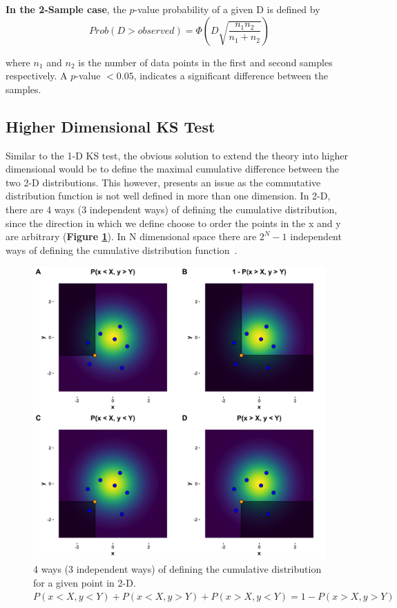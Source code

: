 \documentclass[codesnippet]{jss}
\begin{document}
\textbf{In the 2-Sample case}, the $p$-value probability of a given D is defined by
\begin{equation} \label{eq:3}
Prob(D > observed) = \Phi ( D\sqrt{\frac{n_1n_2}{n_1+n_2}})
\end{equation}

where $n_1$ and $n_2$ is the number of data points in the first and second samples respectively. A $p$-value $< 0.05$, indicates a significant difference between the samples.

\subsection{Higher Dimensional KS Test}

Similar to the 1-D KS test, the obvious solution to extend the theory into higher dimensional would be to define the maximal cumulative difference between the two 2-D distributions. This however, presents an issue as the commutative distribution function is not well defined in more than one dimension. In 2-D, there are 4 ways (3 independent ways) of defining the cumulative distribution, since the direction in which we define choose to order the points in the x and y are arbitrary (\textbf{Figure \ref{fig:kstest2Dissue}}). In N dimensional space there are $2^{N}-1$ independent ways of defining the cumulative distribution function~\citep{Peacock1983}.


\begin{figure}[t!]
\centering
\includegraphics{CDF2Dissue}
\caption{\label{fig:kstest2Dissue} 4 ways (3 independent ways) of defining the cumulative distribution for a given point in 2-D.
$P(x < X, y < Y) + P(x < X, y > Y) + P(x > X, y < Y) = 1 - P(x > X, y > Y)$}
\end{figure}
\end{document}
